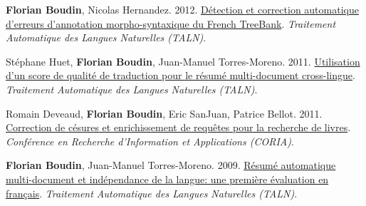 \item 
\textbf{Florian Boudin}, Nicolas Hernandez.
2012.
\href{https://aclanthology.org/F12-2021.pdf}{Détection et correction automatique d’erreurs d’annotation morpho-syntaxique du French TreeBank}.
\textit{Traitement Automatique des Langues Naturelles (TALN)}.
\label{boudin-hernandez-2012-detection}

\item 
Stéphane Huet, \textbf{Florian Boudin}, Juan-Manuel Torres-Moreno.
2011.
\href{https://aclanthology.org/2011.jeptalnrecital-long.5.pdf}{Utilisation d’un score de qualité de traduction pour le résumé multi-document cross-lingue}.
\textit{Traitement Automatique des Langues Naturelles (TALN)}.
\label{huet-etal-2011-utilisation}

\item 
Romain Deveaud, \textbf{Florian Boudin}, Eric SanJuan, Patrice Bellot.
2011.
\href{https://asso-aria.org/coria/2011/89.pdf}{Correction de césures et enrichissement de requêtes pour la recherche de livres}.
\textit{Conférence en Recherche d’Information et Applications (CORIA)}.
\label{deveaud-etal-2011-correction}

\item 
\textbf{Florian Boudin}, Juan-Manuel Torres-Moreno.
2009.
\href{https://aclanthology.org/2009.jeptalnrecital-court.35.pdf}{Résumé automatique multi-document et indépendance de la langue: une première évaluation en français}.
\textit{Traitement Automatique des Langues Naturelles (TALN)}.
\label{boudin-torres-moreno-2009-resume}